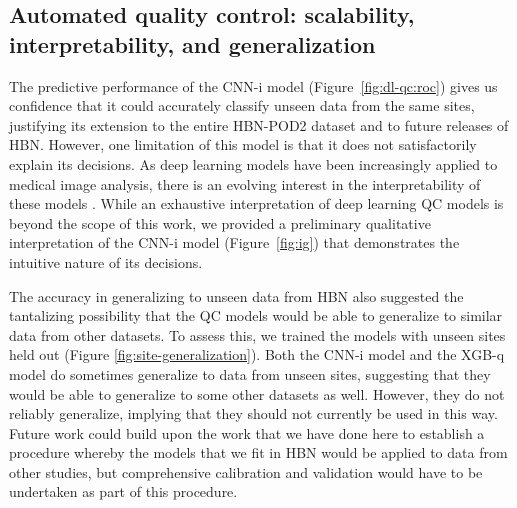 \documentclass[fleqn,10pt,inline]{wlscirep}
\begin{document}
\subsection*{Automated quality control: scalability, interpretability, and generalization}

The predictive
performance of the CNN-i model (Figure~\ref{fig:dl-qc:roc}) gives
us confidence that it could accurately classify unseen data from the same sites, justifying its
extension to the entire HBN-POD2 dataset and to future releases of HBN. However, one limitation of this model is that it
does not satisfactorily explain its decisions. As deep learning models have been increasingly
applied to medical image analysis, there is an evolving interest in the
interpretability of these models \cite{salahuddin2022transparency, lipton2017doctor,
Zech2018-ki, Ghassemi2021-zg}. While an
exhaustive interpretation of deep learning QC models is beyond the scope of this
work, we provided a preliminary qualitative interpretation of the CNN-i model
(Figure~\ref{fig:ig}) that demonstrates the intuitive nature of its decisions. 

The accuracy in generalizing to unseen data from HBN also suggested the tantalizing possibility that the QC models would be able to generalize to similar data from other datasets. To assess this, we trained the models with unseen sites held out (Figure \ref{fig:site-generalization}). Both the CNN-i model and the XGB-q model do sometimes generalize to data from unseen sites, suggesting that they would be able to generalize to some other datasets as well. However, they do not reliably generalize, implying that they should not currently be used in this way. Future work could build upon the work that we have done here to establish a procedure whereby the models that we fit in HBN would be applied to data from other studies, but comprehensive calibration and validation would have to be undertaken as part of this procedure. 
\end{document}
